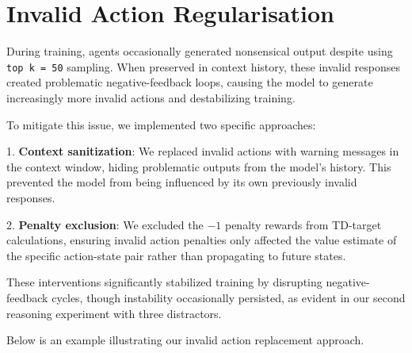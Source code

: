 \documentclass[11pt,a4paper]{article}
\begin{document}
\newpage
\section{Invalid Action Regularisation}
\label{appendix:invalid_action}
During training, agents occasionally generated nonsensical output despite using \texttt{top k = 50} sampling. When preserved in context history, these invalid responses created problematic negative-feedback loops, causing the model to generate increasingly more invalid actions and destabilizing training.

To mitigate this issue, we implemented two specific approaches:

1. \textbf{Context sanitization}: We replaced invalid actions with warning messages in the context window, hiding problematic outputs from the model's history. This prevented the model from being influenced by its own previously invalid responses.

2. \textbf{Penalty exclusion}: We excluded the $-1$ penalty rewards from TD-target calculations, ensuring invalid action penalties only affected the value estimate of the specific action-state pair rather than propagating to future states.

These interventions significantly stabilized training by disrupting negative-feedback cycles, though instability occasionally persisted, as evident in our second reasoning experiment with three distractors.

Below is an example illustrating our invalid action replacement approach.
\end{document}
